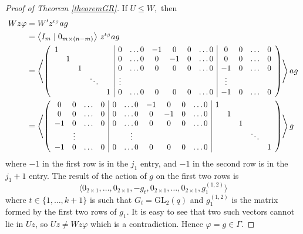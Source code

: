 \documentclass[a4paper,reqno,11pt]{amsart}
\theoremstyle{definition}
\theoremstyle{remark}
\numberwithin{equation}{section}
\newcommand{\GL}{{\mathrm{GL}}}
\newcommand*{\Scale}[2][4]{\scalebox{#1}{$#2$}}
\begin{document}
\begin{proof}[Proof of Theorem {\rm \ref{theoremGR}}]
 If $U \le W,$ then 
 \begingroup
\allowdisplaybreaks
 \begin{align*}
 Wz\varphi & = W'z^{\iota_{\beta}}ag \\ & = 
 \left\langle I_m\mid 0_{m \times (n-m)} \right\rangle \, z^{\iota_{\beta}}ag \\
& =\Scale[0.95]{\left \langle \left(\begin{array}{ccccc|cccccc|cccc}
1 &  &   &        &          & 0 & \ldots 0 &-1 & 0 & 0 & \ldots 0 &       0  & 0 & \ldots &  0 \\         
  &1 &   &        &          & 0 & \ldots 0 & 0 &-1 & 0 & \ldots 0 &       0  & 0 & \ldots &  0 \\
  &  &1  &        &          & 0 & \ldots 0 & 0 &0  & 0 & \ldots 0 &       -1 & 0 & \ldots &  0 \\
  &  &   & \ddots &          & \vdots &     &   &   &   &          &   \vdots &   &        &    \\
  &  &   &        &1         & 0 & \ldots 0 & 0 &0  & 0 & \ldots 0 &       -1 & 0 & \ldots &  0 \\ 
\end{array}\right)
\right \rangle}\, a g\\
& = \Scale[0.95]{ \left \langle \left(\begin{array}{cccc|cccccc|ccccc}
 0  & 0 & \ldots &  0          & 0 & \ldots 0 &-1 & 0 & 0 & \ldots 0 &       1 &  &   &        & \\         
 0  & 0 & \ldots &  0        & 0 & \ldots 0 & 0 &-1 & 0 & \ldots 0 &         &1 &   &        &   \\
 -1 & 0 & \ldots &  0         & 0 & \ldots 0 & 0 &0  & 0 & \ldots 0 &         &  &1  &        &  \\
  &   \vdots &   &        &            & \vdots &     &   &   &   &           &  &   & \ddots &  \\
  -1 & 0 & \ldots &  0        & 0 & \ldots 0 & 0 &0  & 0 & \ldots 0 &        &  &   &        &1  \\ 
\end{array}\right)
\right \rangle}\, g
 \end{align*}
 \endgroup
 where $-1$ in the first row is in the $j_1$ entry, and $-1$ in the second row is in the $j_1+1$ entry. The result of the action of $g$ on the first two rows is 
 $$\langle 0_{2\times 1}, \ldots, 0_{2\times 1}, -g_t, 0_{2\times 1}, \ldots, 0_{2\times 1}, g_1^{(1,2)} \rangle $$ where $t \in \{1, \ldots, k+1\}$ is such that $G_t=\GL_2(q)$ and $g_1^{(1,2)}$ is the matrix formed by the first two rows of $g_1.$ It is easy to see that  two such vectors cannot lie in $Uz$, so  $Uz \ne Wz \varphi$ which is a contradiction. Hence $\varphi =g\in \Gamma.$ 
 

\end{proof}
\end{document}
